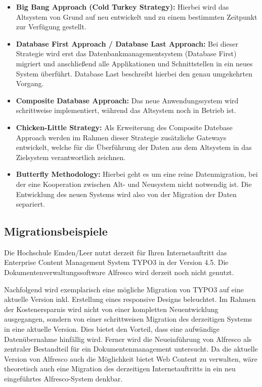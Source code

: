 \begin{itemize}
	\item \textbf{Big Bang Approach (Cold Turkey Strategy):} Hierbei wird das Altsystem von Grund auf neu entwickelt und zu einem bestimmten Zeitpunkt zur Verfügung gestellt.	
	
	\item \textbf{Database First Approach / Database Last Approach:} Bei dieser Strategie wird erst das Datenbankmanagementsystem (Database First) migriert und anschließend alle Applikationen und Schnittstellen in ein neues System überführt. Database Last beschreibt hierbei den genau umgekehrten Vorgang.
	
	\item \textbf{Composite Database Approach:} Das neue Anwendungssystem wird schrittweise implementiert, während das Altsystem noch in Betrieb ist.
	
	\item \textbf{Chicken-Little Strategy:} Als Erweiterung des Composite Datebase Approach werden im Rahmen dieser Strategie zusätzliche Gateways entwickelt, welche für die Überführung der Daten aus dem Altsystem in das Zielsystem verantwortlich zeichnen.
	
	\item \textbf{Butterfly Methodology:} Hierbei geht es um eine reine Datenmigration, bei der eine Kooperation zwischen Alt- und Neusystem nicht notwendig ist.  Die Entwicklung des neuen Systems wird also von der Migration der Daten separiert.
\end{itemize}


\subsection{Migrationsbeispiele}
\label{subsection_migrationsbeispiele}

Die Hochschule Emden/Leer nutzt derzeit für Ihren Internetauftritt das Enterprise Content Management System TYPO3 in der Version 4.5. Die Dokumentenverwaltungssoftware Alfresco wird derzeit noch nicht genutzt. 

Nachfolgend wird exemplarisch eine mögliche Migration von TYPO3 auf eine aktuelle Version inkl. Erstellung eines responsive Designs beleuchtet. Im Rahmen der Kostenersparnis wird nicht von einer kompletten Neuentwicklung ausgegangen, sondern von einer schrittweisen Migration des derzeitigen Systems in eine aktuelle Version. Dies bietet den Vorteil, dass eine aufwändige Datenübernahme hinfällig wird. Ferner wird die Neueinführung von Alfresco als zentraler Bestandteil für ein Dokumentenmanagement untersucht. Da die aktuelle Version von Alfresco auch die Möglichkeit bietet Web Content zu verwalten, wäre theoretisch auch eine Migration des derzeitigen Internetauftritts in ein neu eingeführtes Alfresco-System denkbar.

